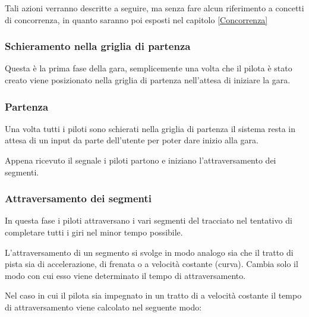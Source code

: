\documentclass[a4paper,11pt, twoside]{book}
\begin{document}
	Tali azioni verranno descritte a seguire, ma senza fare alcun riferimento a concetti
	di concorrenza, in quanto saranno poi esposti nel capitolo \ref{Concorrenza}

	\subsubsection{Schieramento nella griglia di partenza}
	  Questa è la prima fase della gara, semplicemente una volta che il pilota è stato creato
	  viene posizionato nella griglia di partenza nell'attesa di iniziare la gara.
	  
	\subsubsection{Partenza}
	
	  Una volta tutti i piloti sono schierati nella griglia di partenza il sistema resta in attesa di un input
	  da parte dell'utente per poter dare inizio alla gara.
	  
	  Appena ricevuto il segnale i piloti partono e iniziano l'attraversamento dei segmenti.
	  
	\subsubsection{Attraversamento dei segmenti}
	\label{AttraversamentoSegmenti}
	  In questa fase i piloti attraversano i vari segmenti del tracciato nel tentativo di completare tutti i giri
	  nel minor tempo possibile.
	  
	  L'attraversamento di un segmento si svolge in modo analogo sia che il tratto di pista sia
	  di accelerazione, di frenata o a velocità costante (curva). Cambia solo il modo con cui esso viene 
	  determinato il tempo di attraversamento.
	  
	  Nel caso in cui il pilota sia impegnato in un tratto di a velocità costante
	  il tempo di attraversamento viene calcolato nel seguente modo:
	  
\end{document}
